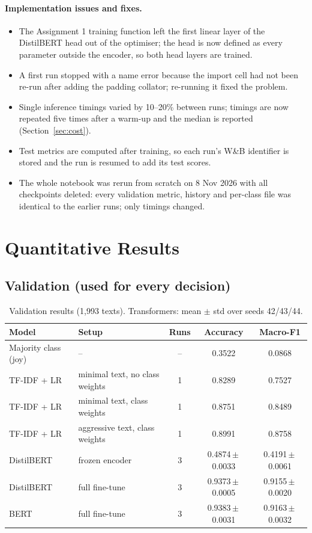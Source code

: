 \documentclass[11pt,a4paper]{article}
\newcommand{\pmstd}[2]{#1\,$\pm$\,#2}
\begin{document}
\paragraph{Implementation issues and fixes.}
\begin{itemize}
  \item The Assignment 1 training function left the first linear layer of the DistilBERT head out of the optimiser; the head is now defined as every parameter outside the encoder, so both head layers are trained.
  \item A first run stopped with a name error because the import cell had not been re-run after adding the padding collator; re-running it fixed the problem.
  \item Single inference timings varied by 10--20\% between runs; timings are now repeated five times after a warm-up and the median is reported (Section~\ref{sec:cost}).
  \item Test metrics are computed after training, so each run's W\&B identifier is stored and the run is resumed to add its test scores.
  \item The whole notebook was rerun from scratch on 8 Nov 2026 with all checkpoints deleted: every validation metric, history and per-class file was identical to the earlier runs; only timings changed.
\end{itemize}

\section{Quantitative Results}

\subsection{Validation (used for every decision)}
\begin{table}[H]
\centering
\caption{Validation results (1,993 texts). Transformers: mean $\pm$ std over seeds 42/43/44.}
\label{tab:val}
\begin{tabular}{@{}llccc@{}}
\toprule
\textbf{Model} & \textbf{Setup} & \textbf{Runs} & \textbf{Accuracy} & \textbf{Macro-F1}\\
\midrule
Majority class (joy) & -- & -- & 0.3522 & 0.0868\\
TF-IDF + LR & minimal text, no class weights & 1 & 0.8289 & 0.7527\\
TF-IDF + LR & minimal text, class weights & 1 & 0.8751 & 0.8489\\
TF-IDF + LR & aggressive text, class weights & 1 & 0.8991 & 0.8758\\
DistilBERT & frozen encoder & 3 & \pmstd{0.4874}{0.0033} & \pmstd{0.4191}{0.0061}\\
DistilBERT & full fine-tune & 3 & \pmstd{0.9373}{0.0005} & \pmstd{0.9155}{0.0020}\\
BERT & full fine-tune & 3 & \pmstd{0.9383}{0.0031} & \pmstd{0.9163}{0.0032}\\
\bottomrule
\end{tabular}
\end{table}
\end{document}
